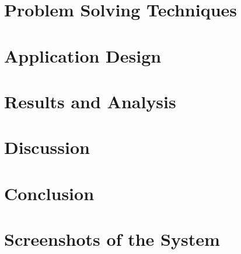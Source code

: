 \documentclass[11pt, a4paper]{article}
\begin{document}
\section{Problem Solving Techniques}


\section{Application Design}


\section{Results and Analysis}


\section{Discussion}


\section{Conclusion}


\newpage
\printbibliography[heading=bibintoc, title={References}]

\newpage
\appendix
\section{Screenshots of the System}


\newpage

\end{document}
